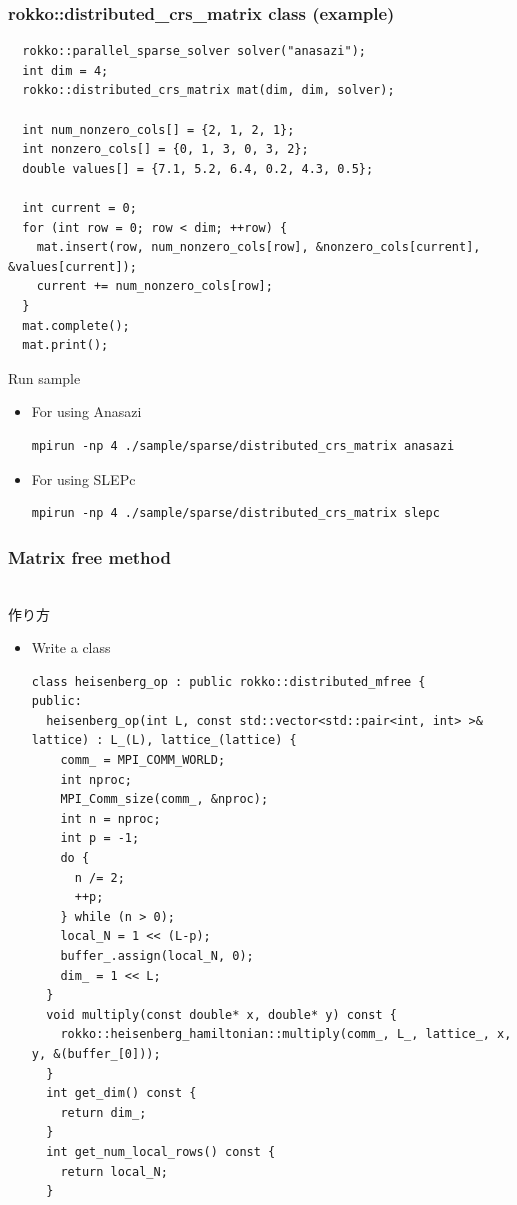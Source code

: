 \begin{frame}[c,fragile]
  \frametitle{rokko::distributed_crs_matrix class (example)
     }
\begin{lstlisting}
  rokko::parallel_sparse_solver solver("anasazi");
  int dim = 4;
  rokko::distributed_crs_matrix mat(dim, dim, solver);

  int num_nonzero_cols[] = {2, 1, 2, 1};
  int nonzero_cols[] = {0, 1, 3, 0, 3, 2};
  double values[] = {7.1, 5.2, 6.4, 0.2, 4.3, 0.5};

  int current = 0;
  for (int row = 0; row < dim; ++row) {
    mat.insert(row, num_nonzero_cols[row], &nonzero_cols[current], &values[current]);
    current += num_nonzero_cols[row]; 
  }
  mat.complete();
  mat.print();
\end{lstlisting}
\noindent
Run sample
  \begin{itemize}
  \item For using Anasazi
\begin{lstlisting}[style=shstyle]
mpirun -np 4 ./sample/sparse/distributed_crs_matrix anasazi
\end{lstlisting}
  \item For using SLEPc
\begin{lstlisting}[style=shstyle]
mpirun -np 4 ./sample/sparse/distributed_crs_matrix slepc
\end{lstlisting}
  \end{itemize}
\end{frame}


\begin{frame}[c,fragile]
  \frametitle{Matrix free method}
　\\
\noindent
作り方
  \begin{itemize}
  \item Write a class 
\begin{lstlisting}
class heisenberg_op : public rokko::distributed_mfree {
public:
  heisenberg_op(int L, const std::vector<std::pair<int, int> >& lattice) : L_(L), lattice_(lattice) {
    comm_ = MPI_COMM_WORLD;
    int nproc;
    MPI_Comm_size(comm_, &nproc);
    int n = nproc;
    int p = -1;
    do {
      n /= 2;
      ++p;
    } while (n > 0);
    local_N = 1 << (L-p);
    buffer_.assign(local_N, 0);
    dim_ = 1 << L;
  }
  void multiply(const double* x, double* y) const {
    rokko::heisenberg_hamiltonian::multiply(comm_, L_, lattice_, x, y, &(buffer_[0]));
  }
  int get_dim() const {
    return dim_;
  }
  int get_num_local_rows() const {
    return local_N;
  }
\end{lstlisting}
  \end{itemize}
\end{frame}

